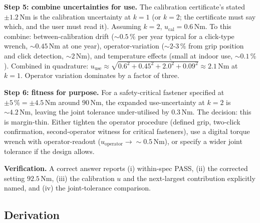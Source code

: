 \begin{exercise}
\textbf{Step 5: combine uncertainties for use.} The calibration
certificate's stated $\pm 1.2 \,\si{\newton\meter}$ is the
calibration uncertainty at $k = 1$ (or $k = 2$; the certificate
must say which, and the user must read it). Assuming $k = 2$,
$u_{\text{cal}} = 0.6 \,\si{\newton\meter}$. To this combine:
between-calibration drift ($\sim 0.5\,\%$ per year typical for a
click-type wrench, $\sim 0.45 \,\si{\newton\meter}$ at one year),
operator-variation ($\sim 2$-$3\,\%$ from grip position and click
detection, $\sim 2 \,\si{\newton\meter}$), and temperature effects
(small at indoor use, $\sim 0.1\,\%$). Combined in quadrature:
$u_{\text{use}} \approx \sqrt{0.6^{2} + 0.45^{2} + 2.0^{2} + 0.09^{2}}
\approx 2.1 \,\si{\newton\meter}$ at $k = 1$. Operator variation
dominates by a factor of three.

\textbf{Step 6: fitness for purpose.} For a safety-critical fastener
specified at $\pm 5\,\% = \pm 4.5 \,\si{\newton\meter}$ around
$90 \,\si{\newton\meter}$, the expanded use-uncertainty at $k = 2$
is $\sim 4.2 \,\si{\newton\meter}$, leaving the joint tolerance
under-utilised by $0.3 \,\si{\newton\meter}$. The decision: this is
margin-thin. Either tighten the operator procedure (defined grip,
two-click confirmation, second-operator witness for critical
fasteners), use a digital torque wrench with operator-readout
($u_{\text{operator}} \to \sim 0.5 \,\si{\newton\meter}$), or
specify a wider joint tolerance if the design allows.

\textbf{Verification.} A correct answer reports (i) within-spec
PASS, (ii) the corrected setting $92.5 \,\si{\newton\meter}$, (iii)
the calibration $u$ and the next-largest contribution explicitly
named, and (iv) the joint-tolerance comparison.
\end{exercise}

\subsection*{Derivation}

